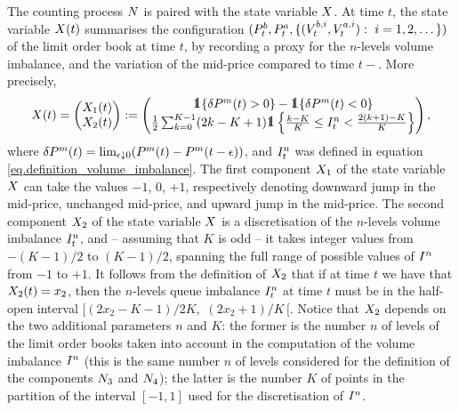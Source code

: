 \documentclass[10pt, article,table]{article}
\begin{document}
The counting process $\multiCountingProc$ is paired with the state variable $\stateVariable$. At time $t$, the state variable $\stateVariable(t)$ summarises the configuration $(\bestBidPrice_t,\bestAskPrice_t,\lbrace( \nthBestBidVolume[i]_t, \nthBestAskVolume[i]_t): \, \, i=1,2,\dots \rbrace)$ of the limit order book at time $t$, by recording a proxy for the $n$-levels volume imbalance, and the variation of the mid-price compared to time $t-$. More precisely, 
\begin{equation}\label{eq.state-variable}
 \stateVariable(t)
 =
 \begin{pmatrix}
 \stateVariable_1 (t)
 \\
 \stateVariable_2(t)
 \end{pmatrix}
 :=
 \begin{pmatrix}
 \one\lbrace\delta\midprice(t)>0\rbrace - \one\lbrace\delta\midprice(t)<0\rbrace
 \\
 \half\sum_{k=0}^{K-1} (2k-K+1 )\one\left\lbrace \frac{k-K}{K} \leq \volumeImbalance^n_t < \frac{2(k+1)-K}{K} \right\rbrace
 \end{pmatrix},
\end{equation}
where $\delta\midprice(t) = \lim_{\epsilon\downarrow 0} (\midprice(t) - \midprice(t-\epsilon) )$, and $\volumeImbalance^{n}_t$ was defined in equation \eqref{eq.definition_volume_imbalance}. The first component $\stateVariable_1$ of the state variable $\stateVariable$ can take the values $-1$, $0$, $+1$, respectively denoting downward jump in the mid-price, unchanged mid-price, and upward jump in the mid-price. The second component $\stateVariable_2$ of the state variable $\stateVariable$ is a discretisation of the $n$-levels volume imbalance $\volumeImbalance^{n}_t$, and -- assuming that $K$ is odd -- it takes integer values from $-(K-1)/2$ to $(K-1)/2$, spanning the full range of possible values of $\volumeImbalance^n$ from $-1$ to $+1$. 
It follows from the definition of $\stateVariable_2$ that if at time $t$ we have that $\stateVariable_2 (t) = x_2$, then the $n$-levels queue imbalance $\volumeImbalance^n_t$ at time $t$ must be in the half-open interval $[(2x_2 -K -1)/2K, \, \, (2x_2 +1)/K \, [$.
Notice that $\stateVariable_2$ depends on the two additional parameters $n$ and $K$: the former is the number $n$ of levels of the limit order books taken into account in the computation of the volume imbalance $\volumeImbalance^n$ (this is the same number $n$ of levels considered for the definition of the components $\countingProc[3]$ and $\countingProc[4]$); the latter is the number $K$ of points in the partition of the interval $[-1,1]$  used for the discretisation of $\volumeImbalance^n$. 
\end{document}
